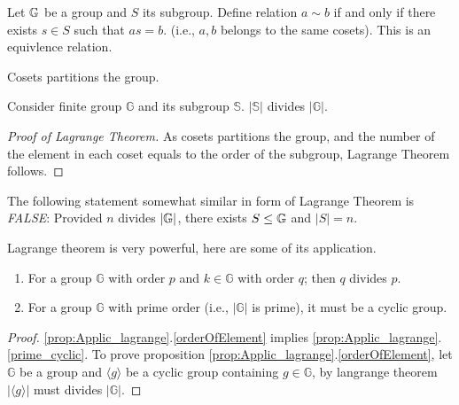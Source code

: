 \documentclass[../note.tex]{subfiles}
\begin{document}
\begin{lemma}
	Let $\mathbb{G}$ be a group and $S$ its subgroup. Define relation $a \sim b$ if and only if there exists $s \in S$ such that $as = b$. (i.e., $a,b$ belongs to the same cosets). This is an equivlence relation.  
\end{lemma}

\begin{theorem}
Cosets partitions the group. 
\end{theorem}

\begin{theorem}
Consider finite group $\mathbb{G}$ and its subgroup $\mathbb{S}$. $|\mathbb{S}|$ divides $|\mathbb{G}|.$	
\end{theorem}


\begin{proof}[Proof of Lagrange Theorem]
	As cosets partitions the group, and the number of the element in each coset equals to the order of the subgroup, Lagrange Theorem follows.
\end{proof}

The following statement somewhat similar in form of Lagrange Theorem is \emph{FALSE}:
Provided  $n$ divides $  |\mathbb{G}|$, there exists $S \leq \mathbb{G}$ and $|S|=n$.

\begin{proposition}\label{prop:Applic_lagrange}
	Lagrange theorem is very powerful, here are some of its application.
\begin{enumerate}
	\item \label{orderOfElement}For a group $\mathbb{G}$ with order $p$ and $k \in \mathbb{G}$ with order $q$; then $q$ divides $p$.
	\item \label{prime_cyclic} For a group $\mathbb{G}$ with prime order (i.e., $|\mathbb{G}|$ is prime), it must be a cyclic group.
\end{enumerate}
\end{proposition}

\begin{proof}
	\ref{prop:Applic_lagrange}.\ref{orderOfElement} implies \ref{prop:Applic_lagrange}.\ref{prime_cyclic}.
	To prove proposition \ref{prop:Applic_lagrange}.\ref{orderOfElement}, let $\mathbb{G}$ be a group and $\langle g\rangle$ be a cyclic group containing $g \in \mathbb{G}$, by langrange theorem $|\langle g\rangle|$ must divides $|\mathbb{G}|$.
\end{proof}
\end{document}

